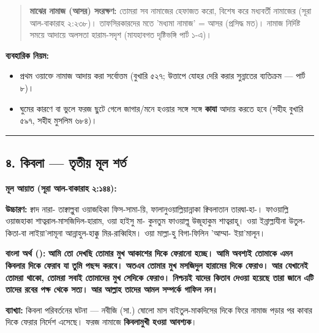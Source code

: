 \begin{quote}
\textbf{মাঝের নামাজ (আসর) সংরক্ষণ:} তোমরা সব নামাজের হেফাজত করো, বিশেষ করে মধ্যবর্তী নামাজের (সূরা আল-বাকারাহ ২:২৩৮)। তাফসিরকারদের মতে 'মধ্যমা নামাজ' = আসর (প্রসিদ্ধ মত)। নামাজ নির্দিষ্ট সময়ে আদায়ে অলসতা হারাম-সদৃশ (মাযহাবগত দৃষ্টিভঙ্গি পার্ট ১-এ)।
\end{quote}

\textbf{ব্যবহারিক নিয়ম:}
\begin{itemize}
\item প্রথম ওয়াক্তে নামাজ আদায় করা সর্বোত্তম (বুখারি ৫২৭; উত্তাপে যোহর দেরি করার সুন্নাতের ব্যতিক্রম — পার্ট ৮)।
\item ঘুমের কারণে বা ভুলে ফরজ ছুটে গেলে জাগার/মনে হওয়ার সঙ্গে সঙ্গে \textbf{কাযা} আদায় করতে হবে (সহীহ বুখারি ৫৯৭, সহীহ মুসলিম ৬৮৪)।
\end{itemize}
\medskip\hrule\medskip

\subsection*{৪. কিবলা — তৃতীয় মূল শর্ত}

\textbf{মূল আয়াত (সূরা আল-বাকারাহ ২:১৪৪):}

\begin{center}\end{center}

\textbf{উচ্চারণ:} ক্বাদ নারা- তাক্বাল্লুবা ওয়াজহিকা ফিস-সামা-য়ি, ফালানুওয়াল্লিয়ান্নাকা ক্বিবলাতান তারদ্বা-হা-। ফাওয়াল্লি ওয়াজহাকা শাত্বরাল-মাসজিদিল-হারাম, ওয়া হাইসু মা- কুনতুম ফাওয়াল্লূ উজূহাকুম শাত্বরাহূ। ওয়া ইন্নাল্লাযীনা উতুল-কিতা-বা লাইয়া'লামূনা আন্নাহুল-হাক্কু মির-রাব্বিহিম। ওয়া মাল্লা-হু বিগা-ফিলিন 'আম্মা- ইয়া'মালূন।

\textbf{বাংলা অর্থ ():}
\textbf{আমি তো দেখছি তোমার মুখ আকাশের দিকে ফেরানো হচ্ছে। আমি অবশ্যই তোমাকে এমন কিবলার দিকে ফেরাব যা তুমি পছন্দ করবে। অতএব তোমার মুখ মসজিদুল হারামের দিকে ফেরাও। আর যেখানেই তোমরা থাকো, তোমরা সবাই তোমাদের মুখ সেদিকে ফেরাও। নিশ্চয়ই যাদের কিতাব দেওয়া হয়েছে তারা জানে এটি তাদের রবের পক্ষ থেকে সত্য। আর আল্লাহ তাদের আমল সম্পর্কে গাফিল নন।}

\textbf{ব্যাখ্যা:} কিবলা পরিবর্তনের ঘটনা — নবীজি (সা.) ষোলো মাস বাইতুল-মাকদিসের দিকে ফিরে নামাজ পড়ার পর কাবার দিকে ফেরার নির্দেশ এসেছে। ফরজ নামাজে \textbf{কিবলামুখী হওয়া আবশ্যক}।

